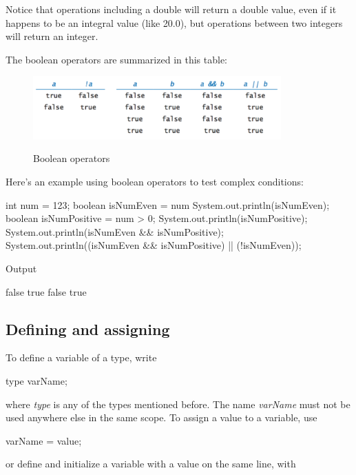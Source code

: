 Notice that operations including a double will return a double value, even if it happens to be an integral value (like 20.0), but operations between two integers will return an integer.

The boolean operators are summarized in this table:

\begin{figure}[h]
	\centering
	\includegraphics[width=0.85\textwidth]{images/booleans}
	\label{fig:booleans_reference}
    \caption{Boolean operators}

\end{figure}

Here's an example using boolean operators to test complex conditions:

\begin{code}
    int num = 123;
    boolean isNumEven = num %
    System.out.println(isNumEven);
    boolean isNumPositive = num > 0;
    System.out.println(isNumPositive);
    System.out.println(isNumEven && isNumPositive);
    System.out.println((isNumEven && isNumPositive) || (!isNumEven));  
\end{code}

Output
\begin{code}
false
true
false
true
\end{code}

\subsection{Defining and assigning}

To define a variable of a type, write 

\begin{code}
    type varName;
\end{code}

where \textit{type} is any of the types mentioned before. The name \textit{varName} must not be used anywhere else in the same scope. To assign a value to a variable, use

\begin{code}
varName = value;
\end{code}

or define and initialize a variable with a value on the same line, with

